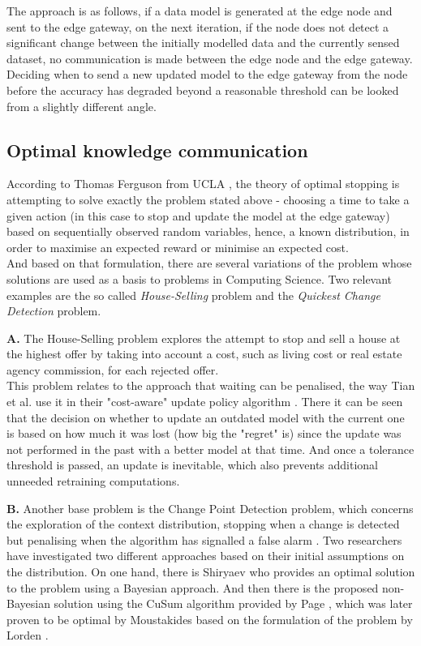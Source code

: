 \documentclass{mpaper}
\begin{document}
The approach is as follows, if a data model is generated at the edge node and sent to the edge gateway, on the next iteration, if the node does not detect a significant change between the initially modelled data and the currently sensed dataset, no communication is made between the edge node and the edge gateway.\\
Deciding when to send a new updated model to the edge gateway from the node before the accuracy has degraded beyond a reasonable threshold can be looked from a slightly different angle. 

\subsection*{Optimal knowledge communication}
According to Thomas Ferguson from UCLA \cite{UCLAbook}, the theory of optimal stopping is attempting to solve exactly the problem stated above - choosing a time to take a given action (in this case to stop and update the model at the edge gateway) based on sequentially observed random variables, hence, a known distribution, in order to maximise an expected reward or minimise an expected cost. \\
And based on that formulation, there are several variations of the problem whose solutions are used as a basis to problems in Computing Science. Two relevant examples are the so called \emph{House-Selling} problem and the \emph{Quickest Change Detection} problem. 

\textbf{A.} The House-Selling problem explores the attempt to stop and sell a house at the highest offer by taking into account a cost, such as living cost or real estate agency commission, for each rejected offer.\\
This problem relates to the approach that waiting can be penalised, the way Tian et al. use it in their "cost-aware" update policy algorithm \cite{tian18}. There it can be seen that the decision on whether to update an outdated model with the current one is based on how much it was lost (how big the "regret" is) since the update was not performed in the past with a better model at that time. And once a tolerance threshold is passed, an update is inevitable, which also prevents additional unneeded retraining computations. 

\textbf{B.} Another base problem is the Change Point Detection problem, which concerns the exploration of the context distribution, stopping when a change is detected but penalising when the algorithm has signalled a false alarm \cite{UCLAbook}. 
Two researchers have investigated two different approaches based on their initial assumptions on the distribution. 
On one hand, there is Shiryaev \cite{shiryaev1963} who provides an optimal solution to the problem using a Bayesian approach. 
And then there is the proposed non-Bayesian solution using the CuSum algorithm provided by Page \cite{page1954}, which was later proven to be optimal by Moustakides \cite{moustakides1986} based on the formulation of the problem by Lorden \cite{lorden1971}.
\end{document}
